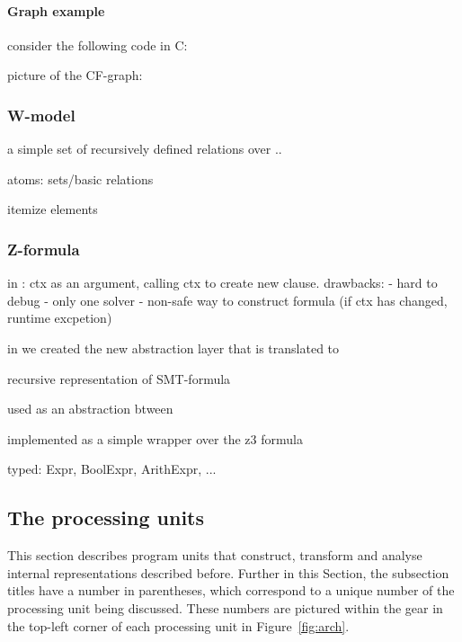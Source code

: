 \paragraph{Graph example}
\label{ch:impl:model:xgraph:example}

consider the following code in C:

picture of the CF-graph:


%

\subsubsection{W-model}
\label{ch:impl:model:wmodel}

a simple set of recursively defined relations over ..

atoms: sets/basic relations

itemize elements


\subsubsection{Z-formula}
\label{ch:impl:model:zformula}


in \porthos{} : ctx as an argument, calling ctx to create new clause. 
drawbacks:
- hard to debug
- only one solver
- non-safe way to construct formula (if ctx has changed, runtime excpetion)

in \porthos[2] we created the new abstraction layer \zformula[] that is translated to 

recursive representation of SMT-formula

used as an abstraction btween

implemented as a simple wrapper over the z3 formula

typed: Expr, BoolExpr, ArithExpr, ...


\subsection{The processing units} %
\label{ch:impl:proc}


This section describes program units that construct, transform and analyse internal representations described before. %
Further in this Section, the subsection titles have a number in parentheses, which correspond to a unique number of the  processing unit being discussed.
These numbers are pictured within the gear in the top-left corner of each processing unit in Figure~\ref{fig:arch}.

